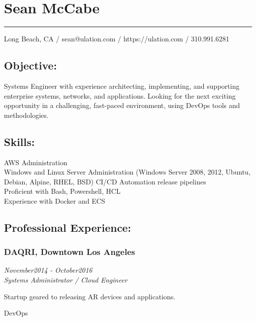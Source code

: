 \documentclass[]{article}
\date{}
\begin{document}
\section{Sean McCabe}\label{sean-mccabe}

\begin{center}\rule{0.5\linewidth}{\linethickness}\end{center}

Long Beach, CA / sean@ulation.com / https://ulation.com / 310.991.6281

\subsection{Objective:}\label{objective}

Systems Engineer with experience architecting, implementing, and
supporting enterprise systems, networks, and applications. Looking for
the next exciting opportunity in a challenging, fast-paced environment,
using DevOps tools and methodologies.

\subsection{Skills:}\label{skills}

AWS Administration\\
Windows and Linux Server Administration (Windows Server 2008, 2012,
Ubuntu, Debian, Alpine, RHEL, BSD) CI/CD Automation release pipelines\\
Proficient with Bash, Powershell, HCL\\
Experience with Docker and ECS

\subsection{Professional Experience:}\label{professional-experience}

\subsubsection{DAQRI, Downtown Los
Angeles}\label{daqri-downtown-los-angeles}

\emph{November2014 - October2016}\\
\emph{Systems Administrator / Cloud Engineer}

Startup geared to releasing AR devices and applications.

DevOps
\end{document}

